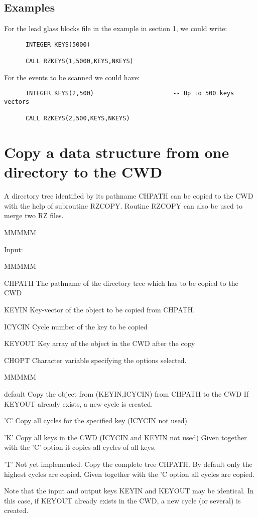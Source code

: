 \subsection{Examples}
\par For the lead glass blocks file in the example in
section 1, we could write:
\begin{verbatim}
      INTEGER KEYS(5000)
 
      CALL RZKEYS(1,5000,KEYS,NKEYS)
\end{verbatim}
For the events to be scanned we could have:
\begin{verbatim}
      INTEGER KEYS(2,500)                      -- Up to 500 keys vectors
 
      CALL RZKEYS(2,500,KEYS,NKEYS)
\end{verbatim}
\section{Copy a data structure from one directory to the CWD}
\par A directory tree identified by its
pathname CHPATH can be copied
to the CWD with the help of subroutine RZCOPY.
Routine RZCOPY can also be used to merge two RZ files.
\begin{DL}{MMMMM}
\item[Input:
]
\begin{DL}{MMMMM}
\item[CHPATH
]The pathname of the directory tree which has to be copied
to the CWD
\item[KEYIN
]Key-vector of the object to be copied from CHPATH.
\item[ICYCIN
]Cycle number of the key to be copied
\item[KEYOUT
]Key array of the object in the CWD after the copy
\item[CHOPT
]Character variable specifying the options selected.
\begin{DL}{MMMMM}
\item[default
]Copy the object from (KEYIN,ICYCIN) from CHPATH to the CWD
\newline If KEYOUT already exists, a new cycle is created.
\item['C'
]Copy all cycles for the specified key (ICYCIN not used)
\item['K'
]Copy all keys in the CWD (ICYCIN and KEYIN not used)
\newline
Given together with the 'C' option it copies all cycles of all keys.
\item['T'
]Not yet implemented. Copy the complete tree CHPATH.
By default only the highest cycles are copied.
\newline Given together with the 'C option all cycles are copied.
\end{DL}
\end{DL}
\end{DL}
\par Note that the input and output keys KEYIN and KEYOUT may be identical.
In this case, if KEYOUT already exists in the CWD, a new cycle (or
several) is created.
